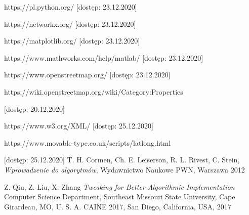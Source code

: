 \documentclass[a4paper, 12pt, twoside, openright]{article}
\begin{document}
\begin{thebibliography}{99}
	

	
	 https://pl.python.org/ [dostęp: 23.12.2020]
	
	 https://networkx.org/ [dostęp: 23.12.2020]
	
	 https://matplotlib.org/ [dostęp: 23.12.2020]

	 https://www.mathworks.com/help/matlab/ [dostęp: 23.12.2020]
	
	 https://www.openstreetmap.org/ [dostęp: 23.12.2020]
	
	
	 https://wiki.openstreetmap.org/wiki/Category:Properties
	
		
	[dostęp: 20.12.2020]

	https://www.w3.org/XML/ 	[dostęp: 25.12.2020]
	
	https://www.movable-type.co.uk/scripts/latlong.html 
	
	
	[dostęp: 25.12.2020]
	T. H. Cormen, Ch. E. Leiserson, R. L. Rivest, C. Stein, \textit{Wprowadzenie do algorytmów}, Wydawnictwo Naukowe PWN, Warszawa 2012
	
	Z. Qiu, Z. Liu, X. Zhang \textit{Tweaking for Better Algorithmic Implementation}	Computer Science Department, Southeast Missouri State University, Cape Girardeau, MO, U. S. A. CAINE 2017, San Diego, California, USA, 2017
	
\end{thebibliography}	
\end{document}
